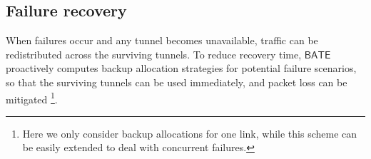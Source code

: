 \documentclass[sigconf]{acmart}
\begin{document}




\subsection{Failure recovery} \label{backup}
When failures occur and any tunnel becomes unavailable, traffic can be redistributed across the surviving tunnels. To reduce recovery time, $\mathsf{BATE}$ proactively computes backup allocation strategies for potential failure scenarios, so that the surviving tunnels can be used immediately, and packet loss 
can be mitigated \footnote{Here we only consider backup allocations for one link, while this scheme can be easily extended to deal with concurrent failures.}. 
\end{document}
